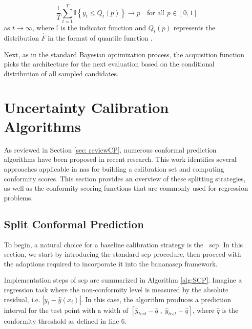 \documentclass[a4paper,oneside,bibliography=totoc]{scrbook}
\begin{document}
{{\begin{equation}
\frac{1}{T} \sum_{t=1}^{T} \mathbb{I} \left\{ y_t \leq Q_t(p) \right\} \rightarrow p \quad \text{for all } p \in [0,1]
\end{equation}
as $t \rightarrow \infty$, where $\mathbb{I}$ is the indicator function and $Q_t(p)$ represents the distribution $\hat{F}$ in the format of quantile function \cite{deshpande2024online, pmlr-v80-kuleshov18a}. 

Next, as in the standard  Bayesian optimization process, the acquisition function picks the architecture for the next evaluation based on the conditional distribution of all sampled candidates.

\section{Uncertainty Calibration Algorithms}
\label{sec:cp}
As reviewed in Section \ref{sec: reviewCP}, numerous conformal prediction algorithms have been proposed in recent research. This work identifies several approaches applicable in \gls{nas} for building a calibration set and computing conformity scores. This section provides an overview of these splitting strategies, as well as the conformity scoring functions that are commonly used for regression problems.
\subsection{Split Conformal Prediction}
\label{sec:scp}
To begin, a natural choice for a baseline calibration strategy is the \gls{scp}. In this section, we start by introducing the standard \gls{scp} procedure, then proceed with the adaptions required to incorporate it into the \gls{bananascp} framework. 

Implementation steps of \gls{scp} are summarized in Algorithm \ref{alg:SCP}. Imagine a regression task where the non-conformity level is measured by the absolute residual, i.e. $|y_i - \hat{y}(x_i)|$. In this case, the algorithm produces a prediction interval for the test point with a width of $\left[\hat{y}_{test} - \hat{q}\;,\; \hat{y}_{test} + \hat{q}\right]$, where $\hat{q}$ is the conformity threshold as defined in line 6.

}}
\end{document}

